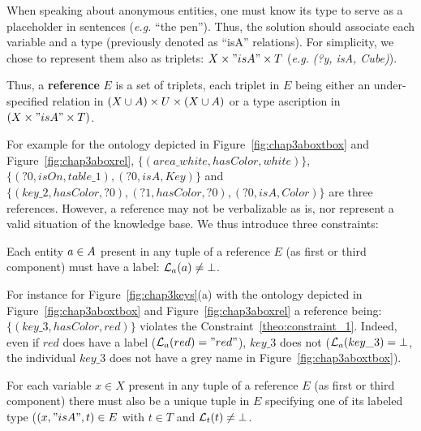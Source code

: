 \documentclass[a4paper,11pt,twoside]{StyleThese}
\begin{document}
When speaking about anonymous entities, one must know its type to serve as a placeholder in sentences (\textit{e.g.} ``the pen'').
Thus, the solution should associate each variable and a type (previously denoted as ``isA'' relations). For simplicity, we chose to represent them also as triplets: $X \times "isA" \times T$ (\textit{e.g.} \textit{(?y, isA, Cube)}). 

\begin{definition}[Reference]
\label{def:reference}
Thus, a \textbf{reference} $E$ is a set of triplets, each triplet in $E$ being either an under-specified relation in $(X \cup A) \times U \times (X \cup A)$ or a type ascription in  $(X \times "isA" \times T)$.
\end{definition}

For example for the ontology depicted in Figure~\ref{fig:chap3aboxtbox} and Figure~\ref{fig:chap3aboxrel}, $\{(area\_white, hasColor, white)\}$, $\{(?0, isOn, table\_1), (?0, isA, Key)\}$ and $\{(key\_2, hasColor, ?0), (?1, hasColor, ?0), (?0, isA, Color)\}$ are three references. However, a reference may not be verbalizable as is, nor represent a valid situation of the knowledge base. We thus introduce three constraints:

\begin{constraint}
\label{theo:constraint_1}
Each entity $a \in A$ present in any tuple of a reference $E$ (as first or third component) must have a label: $\mathcal{L}_a(a) \neq \bot$.
\end{constraint}

For instance for Figure~\ref{fig:chap3keys}(a) with the ontology depicted in Figure~\ref{fig:chap3aboxtbox} and Figure~\ref{fig:chap3aboxrel} a reference being: $\{(key\_3, hasColor, red)\}$ violates the Constraint~\ref{theo:constraint_1}. Indeed, even if $red$ does have a label ($\mathcal{L}_a(red) = "red"$), $key\_3$ does not ($\mathcal{L}_a(key\_3) = \bot$, the individual $key\_3$ does not have a grey name in Figure~\ref{fig:chap3aboxtbox}).

\begin{constraint}
\label{theo:constraint_2}
For each variable $x \in X$ present in any tuple of a reference $E$ (as first or third component) there must also be a unique tuple in $E$ specifying one of its labeled type ($(x, "isA", t) \in E$ with $t \in T$ and $\mathcal{L}_t(t) \neq \bot$.
\end{constraint}
\end{document}
